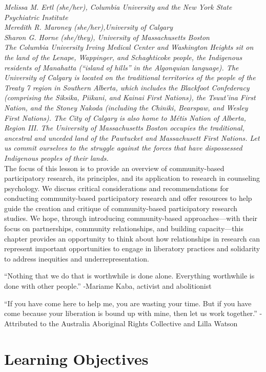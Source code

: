 \documentclass[
  11pt,
]{book}
\begin{document}
\emph{Melissa M. Ertl (she/her), Columbia University and the New York State Psychiatric Institute}\\
\emph{Meredith R. Maroney (she/her),University of Calgary}\\
\emph{Sharon G. Horne (she/they), University of Massachusetts Boston}\\
\emph{The Columbia University Irving Medical Center and Washington Heights sit on the land of the Lenape, Wappinger, and Schaghticoke people, the Indigenous residents of Manahatta (``island of hills'' in the Algonquian language). The University of Calgary is located on the traditional territories of the people of the Treaty 7 region in Southern Alberta, which includes the Blackfoot Confederacy (comprising the Siksika, Piikani, and Kainai First Nations), the Tsuut'ina First Nation, and the Stoney Nakoda (including the Chiniki, Bearspaw, and Wesley First Nations). The City of Calgary is also home to Métis Nation of Alberta, Region III. The University of Massachusetts Boston occupies the traditional, ancestral and unceded land of the Pawtucket and Massachusett First Nations. Let us commit ourselves to the struggle against the forces that have dispossessed Indigenous peoples of their lands.}\\

The focus of this lesson is to provide an overview of community-based participatory research, its principles, and its application to research in counseling psychology. We discuss critical considerations and recommendations for conducting community-based participatory research and offer resources to help guide the creation and critique of community-based participatory research studies. We hope, through introducing community-based approaches---with their focus on partnerships, community relationships, and building capacity---this chapter provides an opportunity to think about how relationships in research can represent important opportunities to engage in liberatory practices and solidarity to address inequities and underrepresentation.

``Nothing that we do that is worthwhile is done alone. Everything worthwhile is done with other people.'' -Mariame Kaba, activist and abolitionist

``If you have come here to help me, you are wasting your time. But if you have come because your liberation is bound up with mine, then let us work together.'' -Attributed to the Australia Aboriginal Rights Collective and Lilla Watson

\section{Learning Objectives}\label{learning-objectives-3}
\end{document}
